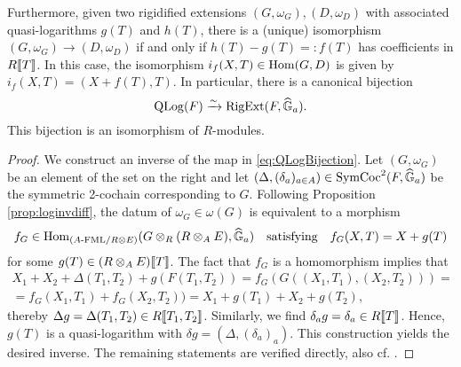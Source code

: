 \documentclass[../main.tex]{subfiles}
\begin{document}
\begin{thm}
Furthermore, given two rigidified extensions
$(G, \omega_G), (D, \omega_{D})$ with associated quasi-logarithms
$g(T)$ and $h(T)$, there is a (unique) isomorphism $(G, \omega_G) \to (D, \omega_{D})$
if and only if $h(T)-g(T) =\colon  f(T)$ has coefficients in $R\llbracket T \rrbracket$. 
In this case, the isomorphism $i_f(X,T) \in \operatorname{Hom}(G, D)$ is
given by $i_f(X,T) = (X+f(T), T)$. In particular, there is a canonical bijection
\begin{equation*}
  \operatorname {QLog}(F) \xrightarrow{\sim} \operatorname {RigExt}(F, \widehat{\mathbb{G}}_a).
\end{equation*}
This bijection is an isomorphism of $R$-modules.
\begin{proof}[Proof]
  We construct an inverse of the map in \eqref{eq:QLogBijection}. Let $(G,
  \omega_G)$ be an element of the set on the right
  and let $(\Delta, (\delta_a)_{a \in A}) \in
  \operatorname{SymCoc}^2(F, \widehat{\mathbb{G}}_a)$ be the symmetric 2-cochain corresponding to $G$.
  Following Proposition \ref{prop:loginvdiff}, the datum of 
  $\omega_G \in \omega(G)$ is equivalent to a morphism 
  $$f_G \in \operatorname{Hom}_{{({A}\textnormal-\allowbreak\mathrm{FML}/{R \otimes E})}}(G \otimes_R (R \otimes_A E), \widehat{\mathbb{G}}_a)
  \quad \text{satisfying} \quad f_G(X,T) = X + g(T)$$
  for some $g(T) \in (R \otimes_A E)\llbracket T \rrbracket$. The fact that 
  $f_G$ is a homomorphism implies that 
  \begin{multline*}
    X_1 + X_2 + \Delta(T_1, T_2) + g(F(T_1,T_2)) = f_G(G((X_1, T_1), (X_2, T_2))) = \\
    = f_G(X_1, T_1) + f_G(X_2, T_2)) = X_1 + g(T_1) + X_2 + g(T_2),
  \end{multline*}
  thereby $\Delta g = \Delta(T_1, T_2) \in R\llbracket T_1, T_2\rrbracket$. Similarly, 
  we find $\delta_a g = \delta_a \in R\llbracket T \rrbracket$. Hence, $g(T)$ is a
  quasi-logarithm with $\delta g = (\Delta, (\delta_a)_a)$. 
  This construction yields the desired inverse.
  The remaining statements are verified directly, also cf. \cite[
  8]{hopkins1994equivariant}.
\end{proof}
\end{thm}
\end{document}
